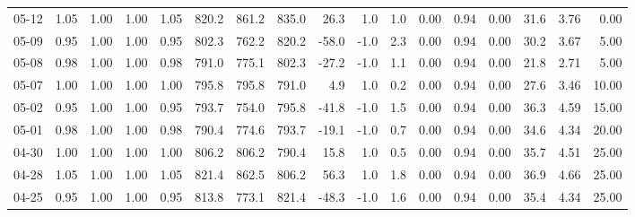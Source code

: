 \begin{threeparttable}
{\begin{tabular}{lrrrrrrrrrrrrrrrr}
  05-12 &         1.05 &           1.00 &          1.00 &          1.05 & 820.2 & 861.2 & 835.0 &       26.3 &                      1.0 &                 1.0 &       0.00 &      0.94 &           0.00 &             31.6 &            3.76 &                   0.00 \\
  05-09 &         0.95 &           1.00 &          1.00 &          0.95 & 802.3 & 762.2 & 820.2 &      -58.0 &                     -1.0 &                 2.3 &       0.00 &      0.94 &           0.00 &             30.2 &            3.67 &                   5.00 \\
  05-08 &         0.98 &           1.00 &          1.00 &          0.98 & 791.0 & 775.1 & 802.3 &      -27.2 &                     -1.0 &                 1.1 &       0.00 &      0.94 &           0.00 &             21.8 &            2.71 &                   5.00 \\
  05-07 &         1.00 &           1.00 &          1.00 &          1.00 & 795.8 & 795.8 & 791.0 &        4.9 &                      1.0 &                 0.2 &       0.00 &      0.94 &           0.00 &             27.6 &            3.46 &                  10.00 \\
  05-02 &         0.95 &           1.00 &          1.00 &          0.95 & 793.7 & 754.0 & 795.8 &      -41.8 &                     -1.0 &                 1.5 &       0.00 &      0.94 &           0.00 &             36.3 &            4.59 &                  15.00 \\
  05-01 &         0.98 &           1.00 &          1.00 &          0.98 & 790.4 & 774.6 & 793.7 &      -19.1 &                     -1.0 &                 0.7 &       0.00 &      0.94 &           0.00 &             34.6 &            4.34 &                  20.00 \\
  04-30 &         1.00 &           1.00 &          1.00 &          1.00 & 806.2 & 806.2 & 790.4 &       15.8 &                      1.0 &                 0.5 &       0.00 &      0.94 &           0.00 &             35.7 &            4.51 &                  25.00 \\
  04-28 &         1.05 &           1.00 &          1.00 &          1.05 & 821.4 & 862.5 & 806.2 &       56.3 &                      1.0 &                 1.8 &       0.00 &      0.94 &           0.00 &             36.9 &            4.66 &                  25.00 \\
  04-25 &         0.95 &           1.00 &          1.00 &          0.95 & 813.8 & 773.1 & 821.4 &      -48.3 &                     -1.0 &                 1.6 &       0.00 &      0.94 &           0.00 &             35.4 &            4.34 &                  25.00 \\

\end{tabular}}
\end{threeparttable}
